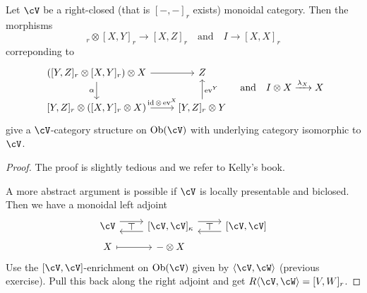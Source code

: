 \documentclass[a4paper,11pt,oneside,openany]{scrbook}
\begin{document}
\begin{prop}
	Let $ \cV $ be a right-closed (that is $ [-,-]_r $ exists) monoidal category.
	Then the morphisms
	\begin{displaymath}
		[Y,Z]_r \otimes [X,Y]_r\to [X,Z]_r\quad\text{and}\quad I\to[X,X]_r
	\end{displaymath}
	correponding to
	\begin{displaymath}
		\begin{tikzcd}
			([Y,Z]_r \otimes [X,Y]_r) \otimes X \arrow[r]\arrow[d, "\alpha"'] & Z \\
			\lbrack Y,Z\rbrack_r \otimes ([X,Y]_r \otimes X) \arrow[r, "\id\otimes \ev^X"]  & \lbrack Y,Z\rbrack_r\otimes Y \arrow[u, "\ev^Y"']
		\end{tikzcd}\quad \text{and}\quad
		I\otimes X \xrightarrow{\lambda_X} X
	\end{displaymath}
	give a $\cV$-category structure on $\Ob(\cV)$ with underlying category
    isomorphic to $\cV$.
\end{prop}
\begin{proof}
	The proof is slightly tedious and we refer to Kelly's book.

	A more abstract argument is possible if $ \cV $ is locally presentable and biclosed.
	Then we have a monoidal left adjoint
	\begin{displaymath}
		\begin{tikzcd}[row sep = tiny]
			\cV
			\arrow[r, shift left=.5em] \arrow[from=r, shift left=.5em] \arrow[r,phantom, "\top"]
			& \lbrack \cV,\cV\rbrack_{\kappa}
			\arrow[r, shift left=.5em]
			\arrow[from=r, shift left=.5em]
			\arrow[r,phantom, "\top"]
			& \lbrack \cV ,\cV \rbrack\\
			X \arrow[mapsto, r] & -\otimes X
		\end{tikzcd}
	\end{displaymath}
	Use the $ [\cV,\cV] $-enrichment on $ \Ob(\cV) $ given by $ \langle\cV,\cW\rangle $ (previous exercise).
	Pull this back along the right adjoint and get $ R\langle \cV,\cW\rangle = [V,W]_r $.
\end{proof}
\end{document}
